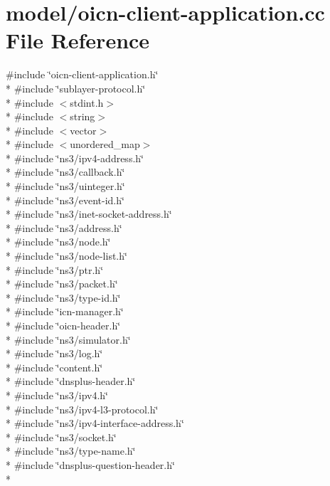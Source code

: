 \hypertarget{oicn-client-application_8cc}{\section{model/oicn-\/client-\/application.cc File Reference}
\label{oicn-client-application_8cc}
}
{\ttfamily \#include \char`\"{}oicn-\/client-\/application.\-h\char`\"{}}\\*
{\ttfamily \#include \char`\"{}sublayer-\/protocol.\-h\char`\"{}}\\*
{\ttfamily \#include $<$stdint.\-h$>$}\\*
{\ttfamily \#include $<$string$>$}\\*
{\ttfamily \#include $<$vector$>$}\\*
{\ttfamily \#include $<$unordered\-\_\-map$>$}\\*
{\ttfamily \#include \char`\"{}ns3/ipv4-\/address.\-h\char`\"{}}\\*
{\ttfamily \#include \char`\"{}ns3/callback.\-h\char`\"{}}\\*
{\ttfamily \#include \char`\"{}ns3/uinteger.\-h\char`\"{}}\\*
{\ttfamily \#include \char`\"{}ns3/event-\/id.\-h\char`\"{}}\\*
{\ttfamily \#include \char`\"{}ns3/inet-\/socket-\/address.\-h\char`\"{}}\\*
{\ttfamily \#include \char`\"{}ns3/address.\-h\char`\"{}}\\*
{\ttfamily \#include \char`\"{}ns3/node.\-h\char`\"{}}\\*
{\ttfamily \#include \char`\"{}ns3/node-\/list.\-h\char`\"{}}\\*
{\ttfamily \#include \char`\"{}ns3/ptr.\-h\char`\"{}}\\*
{\ttfamily \#include \char`\"{}ns3/packet.\-h\char`\"{}}\\*
{\ttfamily \#include \char`\"{}ns3/type-\/id.\-h\char`\"{}}\\*
{\ttfamily \#include \char`\"{}icn-\/manager.\-h\char`\"{}}\\*
{\ttfamily \#include \char`\"{}oicn-\/header.\-h\char`\"{}}\\*
{\ttfamily \#include \char`\"{}ns3/simulator.\-h\char`\"{}}\\*
{\ttfamily \#include \char`\"{}ns3/log.\-h\char`\"{}}\\*
{\ttfamily \#include \char`\"{}content.\-h\char`\"{}}\\*
{\ttfamily \#include \char`\"{}dnsplus-\/header.\-h\char`\"{}}\\*
{\ttfamily \#include \char`\"{}ns3/ipv4.\-h\char`\"{}}\\*
{\ttfamily \#include \char`\"{}ns3/ipv4-\/l3-\/protocol.\-h\char`\"{}}\\*
{\ttfamily \#include \char`\"{}ns3/ipv4-\/interface-\/address.\-h\char`\"{}}\\*
{\ttfamily \#include \char`\"{}ns3/socket.\-h\char`\"{}}\\*
{\ttfamily \#include \char`\"{}ns3/type-\/name.\-h\char`\"{}}\\*
{\ttfamily \#include \char`\"{}dnsplus-\/question-\/header.\-h\char`\"{}}\\*
